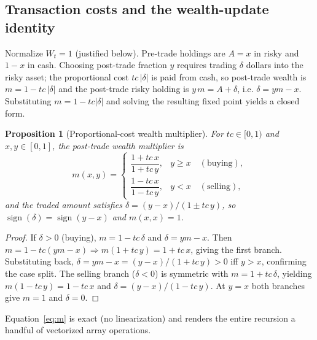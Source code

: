 \documentclass[11pt]{article}
\newtheorem{proposition}{Proposition}
\begin{document}
\subsection{Transaction costs and the wealth-update identity}
\label{sec:tc}
Normalize $W_t=1$ (justified below). Pre-trade holdings are $A=x$ in risky and
$1-x$ in cash. Choosing post-trade fraction $y$ requires trading
$\delta$ dollars into the risky asset; the proportional cost $tc\,|\delta|$ is
paid from cash, so post-trade wealth is $m=1-tc\,|\delta|$ and the post-trade
risky holding is $y\,m=A+\delta$, i.e. $\delta=ym-x$. Substituting
$m=1-tc|\delta|$ and solving the resulting fixed point yields a closed form.

\begin{proposition}[Proportional-cost wealth multiplier]
\label{prop:m}
For $tc\in[0,1)$ and $x,y\in[0,1]$, the post-trade wealth multiplier is
\begin{equation}
m(x,y)=
\begin{cases}
\dfrac{1+tc\,x}{1+tc\,y}, & y\ge x \quad(\text{buying}),\\[2.2ex]
\dfrac{1-tc\,x}{1-tc\,y}, & y< x \quad(\text{selling}),
\end{cases}
\label{eq:m}
\end{equation}
and the traded amount satisfies $\delta=(y-x)/(1\pm tc\,y)$, so
$\operatorname{sign}(\delta)=\operatorname{sign}(y-x)$ and $m(x,x)=1$.
\end{proposition}

\begin{proof}
If $\delta>0$ (buying), $m=1-tc\,\delta$ and $\delta=ym-x$. Then
$m=1-tc(ym-x)\Rightarrow m(1+tc\,y)=1+tc\,x$, giving the first branch.
Substituting back, $\delta=ym-x=(y-x)/(1+tc\,y)>0$ iff $y>x$, confirming the
case split. The selling branch ($\delta<0$) is symmetric with $m=1+tc\,\delta$,
yielding $m(1-tc\,y)=1-tc\,x$ and $\delta=(y-x)/(1-tc\,y)$. At $y=x$ both
branches give $m=1$ and $\delta=0$.
\end{proof}

Equation~\eqref{eq:m} is exact (no linearization) and renders the entire
recursion a handful of vectorized array operations.
\end{document}
